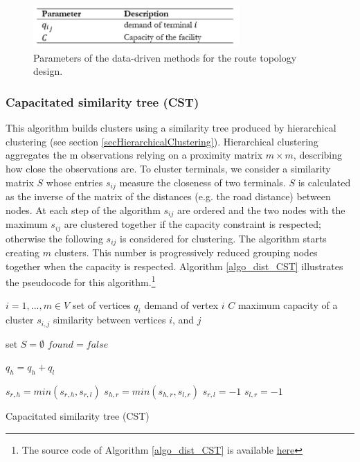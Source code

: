 \begin{figure}[hbt!]
\centering
\includegraphics[width=0.7\textwidth]{SectionDistribution/design_figures/tab_nodeClustering.png}
\captionsetup{type=table}
\caption{Parameters of the data-driven methods for the route topology design.}
\label{tab_nodeClustering}
\end{figure}

\subsubsection{Capacitated similarity tree (CST)}
This algorithm builds clusters using a similarity tree produced by hierarchical clustering (see section \ref{secHierarchicalClustering}). Hierarchical clustering aggregates the m observations relying on a proximity matrix $m \times m$, describing how close the observations are. To cluster terminals, we consider a similarity matrix $S$ whose entries $s_{ij}$ measure the closeness of two terminals. $S$ is calculated as the inverse of the matrix of the distances (e.g. the road distance) between nodes. At each step of the algorithm $s_{ij}$ are ordered and the two nodes with the maximum $s_{ij}$ are clustered together if the capacity constraint is respected; otherwise the following $s_{ij}$ is considered for clustering. The algorithm starts creating $m$ clusters. This number is progressively reduced grouping nodes together when the capacity is respected. Algorithm \ref{algo_dist_CST} illustrates the pseudocode for this algorithm.\footnote{The source code of Algorithm \ref{algo_dist_CST} is available \href{https://github.com/aletuf93/logproj/blob/master/logproj/ml_unsupervised_models.py}{here}} 

\begin{algorithm}[H]
\DontPrintSemicolon
\SetAlgoLined

$i = 1,...,m \in V$ set of vertices\;
$q_i$ demand of vertex $i$\;
$C$ maximum capacity of a cluster \;
$s_{i,j}$ similarity between vertices $i$, and $j$ \;
{
set $S=\emptyset$\;
$found=false$\;

$q_h=q_h+q_l$\;
{
$s_{r,h}=min(s_{r,h},s_{r,l})$\;
$s_{h,r}=min(s_{h,r},s_{l,r})$\;
$s_{r,l}=-1$\;
$s_{l,r}=-1$\;

}
}

\caption{Capacitated similarity tree (CST)}
\label{algo_dist_CST}   
    

\end{algorithm}

